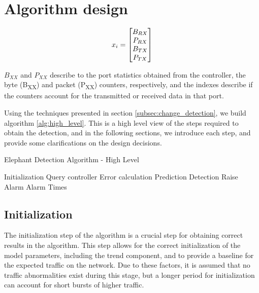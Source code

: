 \section {Algorithm design}

\begin {equation*}
\centering
x_i = 
\begin{bmatrix}
B_{RX}\\
P_{RX}\\
B_{TX}\\
P_{TX}\\
\end{bmatrix}
\end {equation*}

\par $B_{XX}$ and $P_{XX}$ describe to the port statistics obtained from the controller, the byte (B\textsubscript{XX}) and packet (P\textsubscript{XX}) counters, respectively, and the indexes describe if the counters
account for the transmitted or received data in that port.

\par Using the techniques presented in section \ref{subsec:change_detection}, we build algorithm \ref{alg:high_level}. This is a high level view of the steps required to obtain the detection, and in the following sections,
we introduce each step, and provide some clarifications on the design decisions.

\pagebreak

\begin{algorithm}[H]
    \caption{Elephant Detection Algorithm - High Level} \label{alg:high_level}
    \begin{algorithmic}[1]
            \State Initialization
            \State Query controller
            \Loop
                \State Error calculation
                \State Prediction
                \State Detection
                    \State Raise Alarm
                \EndIf
            \EndLoop
        \EndProcedure 
        \State \Return Alarm Times
    \end{algorithmic}
\end{algorithm}

\subsection{Initialization}

The initialization step of the algorithm is a crucial step for obtaining correct results in the algorithm. This step allows for the correct initialization of the model parameters, including the trend component, and to provide a 
baseline for the expected traffic on the network. Due to these factors, it is assumed that no traffic abnormalities exist during this stage, but a longer period for initialization can account for short bursts of higher traffic.

